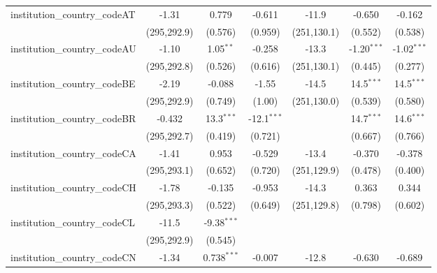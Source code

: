 \begin{tabular}{lcccccc}
   institution\_country\_codeAT          & -1.31         & 0.779         & -0.611        & -11.9         & -0.650        & -0.162\\   
                                         & (295,292.9)   & (0.576)       & (0.959)       & (251,130.1)   & (0.552)       & (0.538)\\   
   institution\_country\_codeAU          & -1.10         & 1.05$^{**}$   & -0.258        & -13.3         & -1.20$^{***}$ & -1.02$^{***}$\\   
                                         & (295,292.8)   & (0.526)       & (0.616)       & (251,130.1)   & (0.445)       & (0.277)\\   
   institution\_country\_codeBE          & -2.19         & -0.088        & -1.55         & -14.5         & 14.5$^{***}$  & 14.5$^{***}$\\   
                                         & (295,292.9)   & (0.749)       & (1.00)        & (251,130.0)   & (0.539)       & (0.580)\\   
   institution\_country\_codeBR          & -0.432        & 13.3$^{***}$  & -12.1$^{***}$ &               & 14.7$^{***}$  & 14.6$^{***}$\\   
                                         & (295,292.7)   & (0.419)       & (0.721)       &               & (0.667)       & (0.766)\\   
   institution\_country\_codeCA          & -1.41         & 0.953         & -0.529        & -13.4         & -0.370        & -0.378\\   
                                         & (295,293.1)   & (0.652)       & (0.720)       & (251,129.9)   & (0.478)       & (0.400)\\   
   institution\_country\_codeCH          & -1.78         & -0.135        & -0.953        & -14.3         & 0.363         & 0.344\\   
                                         & (295,293.3)   & (0.522)       & (0.649)       & (251,129.8)   & (0.798)       & (0.602)\\   
   institution\_country\_codeCL          & -11.5         & -9.38$^{***}$ &               &               &               &   \\   
                                         & (295,292.9)   & (0.545)       &               &               &               &   \\   
   institution\_country\_codeCN          & -1.34         & 0.738$^{***}$ & -0.007        & -12.8         & -0.630        & -0.689\\   

\end{tabular}
